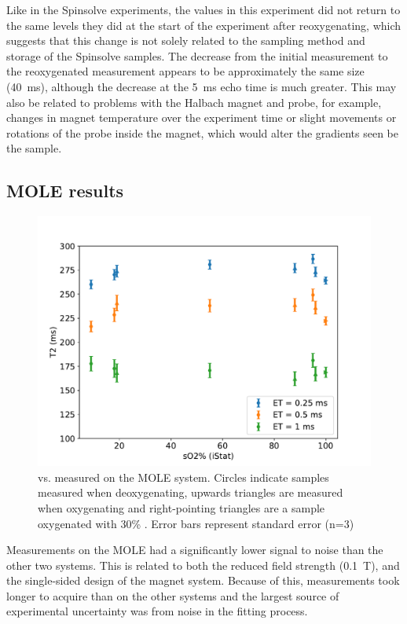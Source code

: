 Like in the Spinsolve experiments, the \Ttwo values in this experiment did not return to the same levels they did at the start of the experiment after reoxygenating, which suggests that this change is not solely related to the sampling method and storage of the Spinsolve samples.
The decrease from the initial \Ttwo measurement to the reoxygenated measurement appears to be approximately the same size (\SI{40}{ms}), although the decrease at the \SI{5}{ms} echo time is much greater.
This may also be related to problems with the Halbach magnet and probe, for example, changes in magnet temperature over the experiment time or slight movements or rotations of the probe inside the magnet, which would alter the gradients seen be the sample.

\subsection{MOLE results}
\begin{figure}[h]
\centering
\includegraphics[width=\textwidth]{figures/stoppedflow/moleT2SO2.pdf}
\caption[Stopped flow \Ttwo vs. \SOtwo measured on the MOLE system]{\Ttwo vs. \SOtwo measured on the MOLE system. Circles indicate samples measured when deoxygenating, upwards triangles are measured when oxygenating and right-pointing triangles are a sample oxygenated with 30\% \Otwo. Error bars represent standard error (n=3)}
\label{fig:sf-moleT2SO2}
\end{figure}
%
Measurements on the MOLE had a significantly lower signal to noise than the other two systems.
This is related to both the reduced field strength (\SI{0.1}{T}), and the single-sided design of the magnet system.
Because of this, measurements took longer to acquire than on the other systems and the largest source of experimental uncertainty was from noise in the fitting process.


